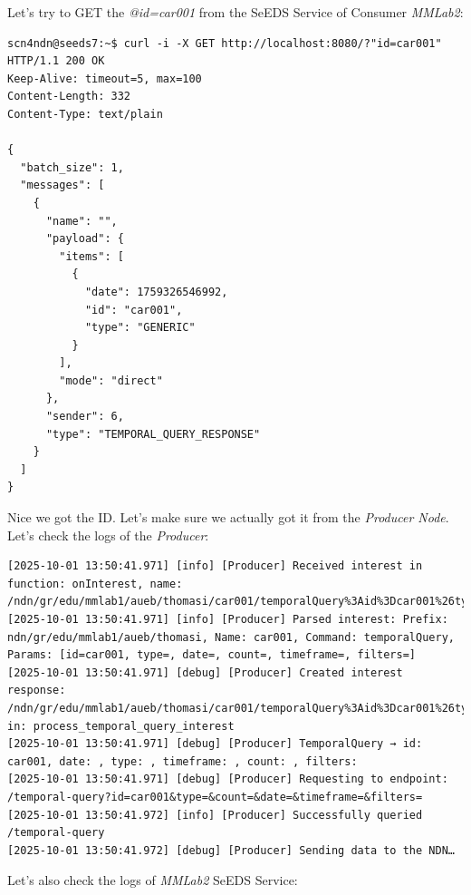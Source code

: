 \documentclass{article}
\begin{document}
Let's try to GET the \textit{@id=car001} from the SeEDS Service of Consumer \emph{MMLab2}:
\begin{lstlisting}[language=curl, caption={GET by ID for \textit{@id=car001} through Node \emph{MMlab2}}, label={lst:http-request-mmlab2-car001}]
scn4ndn@seeds7:~$ curl -i -X GET http://localhost:8080/?"id=car001"
HTTP/1.1 200 OK
Keep-Alive: timeout=5, max=100
Content-Length: 332
Content-Type: text/plain

{
  "batch_size": 1,
  "messages": [
    {
      "name": "",
      "payload": {
        "items": [
          {
            "date": 1759326546992,
            "id": "car001",
            "type": "GENERIC"
          }
        ],
        "mode": "direct"
      },
      "sender": 6,
      "type": "TEMPORAL_QUERY_RESPONSE"
    }
  ]
} 
\end{lstlisting}

Nice we got the ID. Let's make sure we actually got it from the \emph{Producer Node}. Let's check the logs of the \emph{Producer}:

\begin{lstlisting}[language=log, caption={Producer logs after receiving GET by ID from \emph{MMLab2}}, label={lst:producer-logs-get-by-id-car001}]
[2025-10-01 13:50:41.971] [info] [Producer] Received interest in function: onInterest, name: /ndn/gr/edu/mmlab1/aueb/thomasi/car001/temporalQuery%3Aid%3Dcar001%26type%3D%26date%3D%26count%3D%26timeframe%3D%26filters%3D
[2025-10-01 13:50:41.971] [info] [Producer] Parsed interest: Prefix: ndn/gr/edu/mmlab1/aueb/thomasi, Name: car001, Command: temporalQuery, Params: [id=car001, type=, date=, count=, timeframe=, filters=]
[2025-10-01 13:50:41.971] [debug] [Producer] Created interest response: /ndn/gr/edu/mmlab1/aueb/thomasi/car001/temporalQuery%3Aid%3Dcar001%26type%3D%26date%3D%26count%3D%26timeframe%3D%26filters%3D in: process_temporal_query_interest
[2025-10-01 13:50:41.971] [debug] [Producer] TemporalQuery → id: car001, date: , type: , timeframe: , count: , filters: 
[2025-10-01 13:50:41.971] [debug] [Producer] Requesting to endpoint: /temporal-query?id=car001&type=&count=&date=&timeframe=&filters=
[2025-10-01 13:50:41.972] [info] [Producer] Successfully queried /temporal-query
[2025-10-01 13:50:41.972] [debug] [Producer] Sending data to the NDN… 
\end{lstlisting}

Let's also check the logs of \emph{MMLab2} SeEDS Service:
\end{document}
